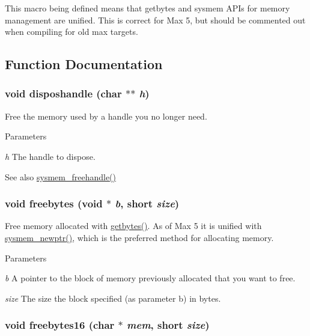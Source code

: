 This macro being defined means that getbytes and sysmem APIs for memory management are unified. This is correct for Max 5, but should be commented out when compiling for old max targets. 

\subsection{Function Documentation}
\hypertarget{group__memory_gae325435a83824eb6b42e0885b68b9110}{
\subsubsection[{disposhandle}]{\setlength{\rightskip}{0pt plus 5cm}void disposhandle (char $\ast$$\ast$ {\em h})}}
\label{group__memory_gae325435a83824eb6b42e0885b68b9110}


Free the memory used by a handle you no longer need. 
\begin{DoxyParams}{Parameters}
\item[{\em h}]The handle to dispose. \end{DoxyParams}
\begin{DoxySeeAlso}{See also}
\hyperlink{group__memory_ga5815994f7d02b77c24f8c684df9acd83}{sysmem\_\-freehandle()} 
\end{DoxySeeAlso}
\hypertarget{group__memory_gaa1dc485c42515917ca377dbaf15b7dcd}{
\subsubsection[{freebytes}]{\setlength{\rightskip}{0pt plus 5cm}void freebytes (void $\ast$ {\em b}, \/  short {\em size})}}
\label{group__memory_gaa1dc485c42515917ca377dbaf15b7dcd}


Free memory allocated with \hyperlink{group__memory_gaa513b95a076519ec168b62d85881f643}{getbytes()}. As of Max 5 it is unified with \hyperlink{group__memory_ga276676be214edff9fe5c9d0681f39ae6}{sysmem\_\-newptr()}, which is the preferred method for allocating memory.


\begin{DoxyParams}{Parameters}
\item[{\em b}]A pointer to the block of memory previously allocated that you want to free. \item[{\em size}]The size the block specified (as parameter b) in bytes. \end{DoxyParams}
\hypertarget{group__memory_gafba42d2b23405e29469392394cf41555}{
\subsubsection[{freebytes16}]{\setlength{\rightskip}{0pt plus 5cm}void freebytes16 (char $\ast$ {\em mem}, \/  short {\em size})}}
\label{group__memory_gafba42d2b23405e29469392394cf41555}


